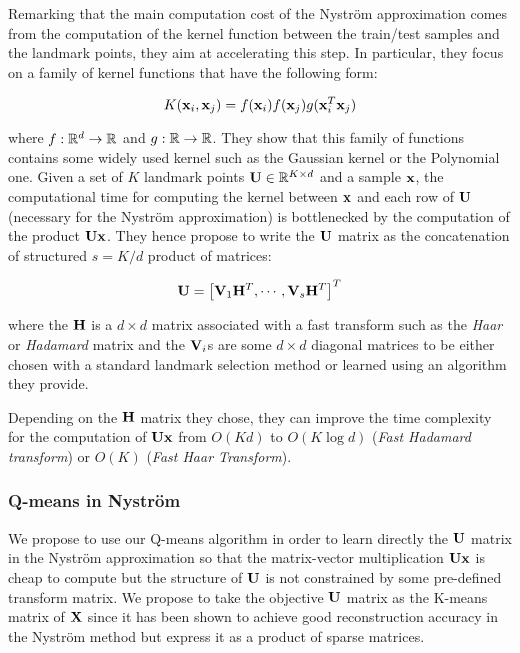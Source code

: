 \documentclass{article}
\begin{document}
Remarking that the main computation cost of the Nyström approximation comes from the computation of the kernel function between the train/test samples and the landmark points, they aim at accelerating this step. In particular, they focus on a family of kernel functions that have the following form:

\begin{equation}
 K({\mathbf{x}}_i, {\mathbf{x}}_j) = f({\mathbf{x}}_i) f({\mathbf{x}}_j) g({\mathbf{x}}_i^T{\mathbf{x}}_j)
\end{equation}

where $f: \mathbb{R}^d \rightarrow \mathbb{R}$ and $g: \mathbb{R} \rightarrow \mathbb{R}$. They show that this family of functions contains some widely used kernel such as the Gaussian kernel or the Polynomial one. Given a set of $K$ landmark points ${\mathbf{U}} \in \mathbb{R}^{K \times d}$ and a sample ${\mathbf{x}}$, the computational time for computing the kernel between ${\mathbf{x}}$ and each row of ${\mathbf{U}}$ (necessary for the Nyström approximation) is bottlenecked by the computation of the product ${\mathbf{U}}{\mathbf{x}}$. They hence propose to write the ${\mathbf{U}}$ matrix as the concatenation of structured $s = K / d$ product of matrices:

\begin{equation}
 {\mathbf{U}} = \left[ {\mathbf{V}}_1 {\mathbf{H}}^T, \cdots, {\mathbf{V}}_s{\mathbf{H}}^T  \right]^T
\end{equation}

where the ${\mathbf{H}}$ is a $d \times d$ matrix associated with a fast transform such as the \textit{Haar} or \textit{Hadamard} matrix and the ${\mathbf{V}}_i$s are some $d \times d$ diagonal matrices to be either chosen with a standard landmark selection method or learned using an algorithm they provide.

Depending on the ${\mathbf{H}}$ matrix they chose, they can improve the time complexity for the computation of ${\mathbf{U}}{\mathbf{x}}$ from $O(Kd)$ to $O(K \log{d})$ (\textit{Fast Hadamard transform}) or $O(K)$ (\textit{Fast Haar Transform}).

\subsubsection{Q-means in Nyström}

We propose to use our Q-means algorithm in order to learn directly the ${\mathbf{U}}$ matrix in the Nyström approximation so that the matrix-vector multiplication ${\mathbf{U}} {\mathbf{x}}$ is cheap to compute but the structure of ${\mathbf{U}}$ is not constrained by some pre-defined transform matrix. We propose to take the objective ${\mathbf{U}}$ matrix as the K-means matrix of ${\mathbf{X}}$ since it has been shown to achieve good reconstruction accuracy in the Nyström method but express it as a product of sparse matrices.
\end{document}
